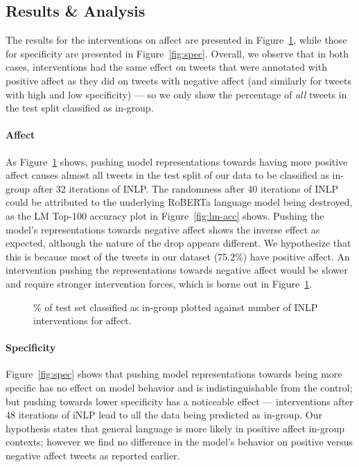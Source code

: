\subsection{Results \& Analysis}

The results for the interventions on affect are presented in Figure~\ref{fig:affect}, while those for specificity are presented in Figure~\ref{fig:spec}. Overall, we observe that in both cases, interventions had the same effect on tweets that were annotated with positive affect as they did on tweets with negative affect (and similarly for tweets with high and low specificity) --- so we only show the percentage of \emph{all} tweets in the test split classified as in-group.

\paragraph{Affect} As Figure~\ref{fig:affect} shows, pushing model representations towards having more positive affect causes almost all tweets in the test split of our data to be classified as in-group after 32 iterations of INLP. The randomness after 40 iterations of INLP could be attributed to the underlying RoBERTa language model being destroyed, as the LM Top-100 accuracy plot in Figure~\ref{fig:lm-acc} shows. Pushing the model's representations towards negative affect shows the inverse effect as expected, although the nature of the drop appears different. We hypothesize that this is because most of the tweets in our dataset (75.2\%) have positive affect. An intervention pushing the representations towards negative affect would be slower and require stronger intervention forces, which is borne out in Figure~\ref{fig:affect}.

\begin{figure}[t]
    \centering
    
    \caption{\% of test set classified as in-group plotted against number of INLP interventions for affect.}
    \label{fig:affect}
\end{figure}

\paragraph{Specificity} Figure~\ref{fig:spec} shows that pushing model representations towards being more specific has no effect on model behavior and is indistinguishable from the control; but pushing towards lower specificity has a noticeable effect --- interventions after 48 iterations of iNLP lead to all the data being predicted as in-group. Our hypothesis states that general language is more likely in positive affect in-group contexts; however we find no difference in the model's behavior on positive versus negative affect tweets as reported earlier.

